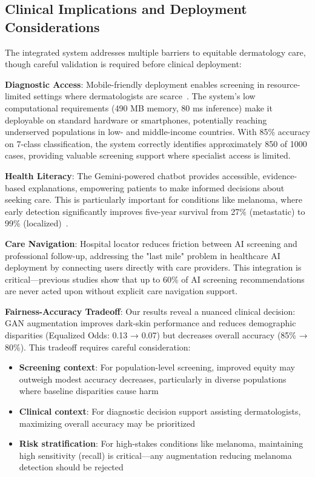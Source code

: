 \documentclass[10pt, twocolumn, letterpaper]{article}
\begin{document}
\subsection{Clinical Implications and Deployment Considerations}

The integrated system addresses multiple barriers to equitable dermatology care, though careful validation is required before clinical deployment:

\textbf{Diagnostic Access}: Mobile-friendly deployment enables screening in resource-limited settings where dermatologists are scarce~\cite{who2020}. The system's low computational requirements (490 MB memory, 80 ms inference) make it deployable on standard hardware or smartphones, potentially reaching underserved populations in low- and middle-income countries. With 85\% accuracy on 7-class classification, the system correctly identifies approximately 850 of 1000 cases, providing valuable screening support where specialist access is limited.

\textbf{Health Literacy}: The Gemini-powered chatbot provides accessible, evidence-based explanations, empowering patients to make informed decisions about seeking care. This is particularly important for conditions like melanoma, where early detection significantly improves five-year survival from 27\% (metastatic) to 99\% (localized)~\cite{siegel2023}.

\textbf{Care Navigation}: Hospital locator reduces friction between AI screening and professional follow-up, addressing the "last mile" problem in healthcare AI deployment by connecting users directly with care providers. This integration is critical—previous studies show that up to 60\% of AI screening recommendations are never acted upon without explicit care navigation support.

\textbf{Fairness-Accuracy Tradeoff}: Our results reveal a nuanced clinical decision: GAN augmentation improves dark-skin performance and reduces demographic disparities (Equalized Odds: 0.13 → 0.07) but decreases overall accuracy (85\% → 80\%). This tradeoff requires careful consideration:
\begin{itemize}[leftmargin=*, itemsep=2pt]
    \item \textbf{Screening context}: For population-level screening, improved equity may outweigh modest accuracy decreases, particularly in diverse populations where baseline disparities cause harm
    \item \textbf{Clinical context}: For diagnostic decision support assisting dermatologists, maximizing overall accuracy may be prioritized
    \item \textbf{Risk stratification}: For high-stakes conditions like melanoma, maintaining high sensitivity (recall) is critical—any augmentation reducing melanoma detection should be rejected
\end{itemize}
\end{document}
